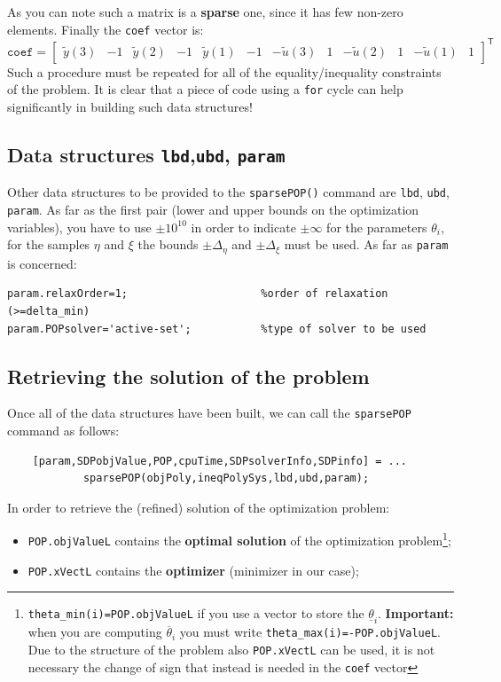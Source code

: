 \noindent
As you can note such a matrix is a \textbf{sparse} one, since it has few non-zero elements. Finally the \texttt{coef} vector is:
{{
    \begin{equation*}
        \texttt{coef}=\begin{bmatrix}
            \tilde{y}(3)&-1& \tilde{y}(2)& -1 &\tilde{y}(1) & -1& -\tilde{u}(3) & 1& -\tilde{u}(2) & 1 & -\tilde{u}(1) & 1
        \end{bmatrix}^\textsf{T}
    \end{equation*}
}}
Such a procedure must be repeated for all of the equality/inequality constraints of the problem. It is clear that a piece of code using a \texttt{for} cycle can help significantly in building such data structures! 

\subsection{Data structures \texttt{lbd},\texttt{ubd}, \texttt{param} }
\noindent
Other data structures to be provided to the \texttt{sparsePOP()} command are \texttt{lbd}, \texttt{ubd}, \texttt{param}. As far as the first pair (lower and upper bounds on the optimization variables), you have to use $\pm{10}^{10}$ in order to indicate $\pm{\infty}$ for the parameters $\theta_i$, for the samples $\eta$ and $\xi$ the bounds $\pm\Delta_\eta$ and $\pm\Delta_\xi$ must be used. As far as \texttt{param} is concerned:
\begin{verbatim}
param.relaxOrder=1;                     %order of relaxation (>=delta_min)
param.POPsolver='active-set';           %type of solver to be used
\end{verbatim}

\subsection{Retrieving the solution of the problem}
Once all of the data structures have been built, we can call the \texttt{sparsePOP} command as follows: 
\begin{verbatim}
    [param,SDPobjValue,POP,cpuTime,SDPsolverInfo,SDPinfo] = ...
            sparsePOP(objPoly,ineqPolySys,lbd,ubd,param);
\end{verbatim}

\noindent
In order to retrieve the (refined) solution of the optimization problem:
\begin{itemize}
    \itemsep0em
    \item \texttt{POP.objValueL} contains the \textbf{optimal solution} of the optimization problem\footnote{\texttt{theta\_min(i)=POP.objValueL} if you use a vector to store the $\underline{\theta}_i$. \textbf{Important: } when you are computing $\overline{\theta}_i$ you must write \texttt{theta\_max(i)=-POP.objValueL}. Due to the structure of the problem also \texttt{POP.xVectL} can be used, it is not necessary the change of sign that instead is needed in the \texttt{coef} vector};
    \item \texttt{POP.xVectL} contains the \textbf{optimizer} (minimizer in our case); 
\end{itemize}


 